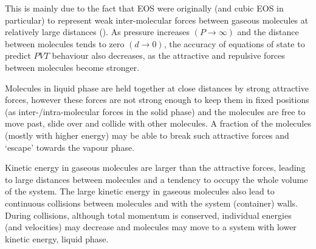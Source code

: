 This is mainly due to the fact that EOS were originally (and cubic EOS in particular) to represent weak inter-molecular forces between gaseous molecules at relatively large distances (). As pressure increases $\left(P\rightarrow \infty\right)$ and the distance between molecules tends to zero $\left(d\rightarrow 0\right)$, the accuracy of equations of state to predict $PVT$ behaviour also decreases, as the attractive and repulsive forces between molecules become stronger. 

Molecules in liquid phase are held together at close distances by strong attractive forces, however these forces are not strong enough to keep them in fixed positions (as inter-/intra-molecular forces in the solid phase) and the molecules are free to move past, slide over and collide with other molecules. A fraction of the molecules (mostly with higher energy) may be able to break such attractive forces and `escape' towards the vapour phase. 

Kinetic energy in gaseous molecules are larger than the attractive forces, leading to large distances between molecules and a tendency to occupy the whole volume of the system. The large kinetic energy in gaseous molecules also lead to continuous collisions between molecules and with the system (container) walls. During collisions, although total momentum is conserved, individual energies (and velocities) may decrease and molecules may move to a system with lower kinetic energy, \ie liquid phase.

\bigskip

